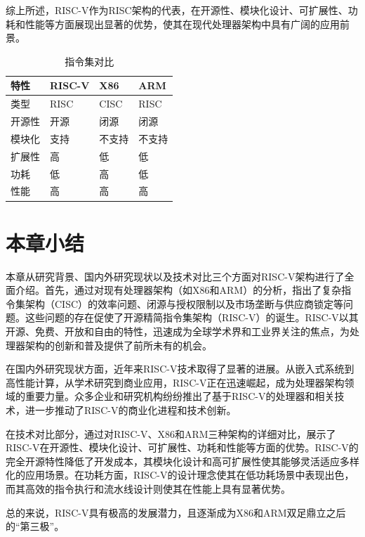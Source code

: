 综上所述，RISC-V作为RISC架构的代表，在开源性、模块化设计、可扩展性、功耗和性能等方面展现出显著的优势，使其在现代处理器架构中具有广阔的应用前景。

\begin{table}[htbp]
	\centering
	\caption{指令集对比}
	\begin{tabularx}{\textwidth}{>{\centering\arraybackslash}X >{\centering\arraybackslash}X >{\centering\arraybackslash}X >{\centering\arraybackslash}X}
		\toprule
		\textbf{特性} & \textbf{RISC-V} & \textbf{X86} & \textbf{ARM} \\
		\midrule
		类型          & RISC            & CISC         & RISC         \\
		开源性         & 开源              & 闭源           & 闭源           \\
		模块化         & 支持              & 不支持          & 不支持          \\
		扩展性         & 高               & 低            & 低            \\
		功耗          & 低               & 高            & 低            \\
		性能          & 高               & 高            & 高            \\
		\bottomrule
	\end{tabularx}
	\label{tab:instruction-set-comparison}
\end{table}

\section{本章小结}
本章从研究背景、国内外研究现状以及技术对比三个方面对RISC-V架构进行了全面介绍。首先，通过对现有处理器架构（如X86和ARM）的分析，指出了复杂指令集架构（CISC）的效率问题、闭源与授权限制以及市场垄断与供应商锁定等问题。这些问题的存在促使了开源精简指令集架构（RISC-V）的诞生。RISC-V以其开源、免费、开放和自由的特性，迅速成为全球学术界和工业界关注的焦点，为处理器架构的创新和普及提供了前所未有的机会。

在国内外研究现状方面，近年来RISC-V技术取得了显著的进展。从嵌入式系统到高性能计算，从学术研究到商业应用，RISC-V正在迅速崛起，成为处理器架构领域的重要力量。众多企业和研究机构纷纷推出了基于RISC-V的处理器和相关技术，进一步推动了RISC-V的商业化进程和技术创新。

在技术对比部分，通过对RISC-V、X86和ARM三种架构的详细对比，展示了RISC-V在开源性、模块化设计、可扩展性、功耗和性能等方面的优势。RISC-V的完全开源特性降低了开发成本，其模块化设计和高可扩展性使其能够灵活适应多样化的应用场景。在功耗方面，RISC-V的设计理念使其在低功耗场景中表现出色，而其高效的指令执行和流水线设计则使其在性能上具有显著优势。

总的来说，RISC-V具有极高的发展潜力，且逐渐成为X86和ARM双足鼎立之后的``第三极''。